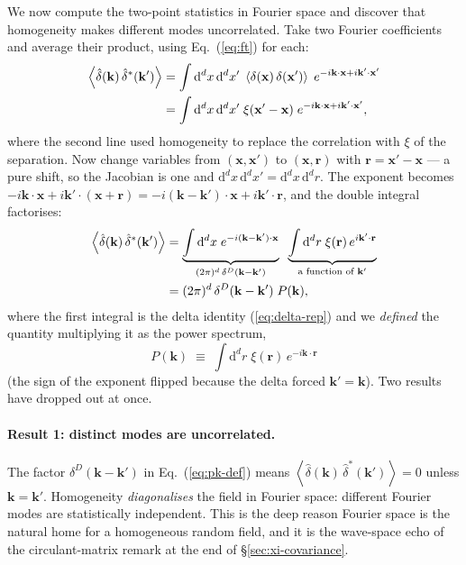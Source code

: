 \documentclass[12pt]{article}
\newcommand{\bk}{\mathbf{k}}
\newcommand{\bx}{\mathbf{x}}
\newcommand{\br}{\mathbf{r}}
\newcommand{\avg}[1]{\left\langle #1 \right\rangle}
\begin{document}
We now compute the two-point statistics in Fourier space and discover
that homogeneity makes different modes uncorrelated.  Take two Fourier
coefficients and average their product, using Eq.~(\ref{eq:ft}) for
each:
\begin{align}
  \avg{\hat\delta(\bk)\,\hat\delta^*(\bk')}
  &= \int \mathrm d^d x\,\mathrm d^d x'\;
     \avg{\delta(\bx)\,\delta(\bx')}\;
     e^{-i\bk\cdot\bx + i\bk'\cdot\bx'} \notag\\
  &= \int \mathrm d^d x\,\mathrm d^d x'\;
     \xi(\bx' - \bx)\;
     e^{-i\bk\cdot\bx + i\bk'\cdot\bx'},
  \label{eq:pk-step1}
\end{align}
where the second line used homogeneity to replace the correlation with
$\xi$ of the separation.  Now change variables from $(\bx, \bx')$ to
$(\bx, \br)$ with $\br = \bx' - \bx$ --- a pure shift, so the Jacobian is
one and $\mathrm d^d x\,\mathrm d^d x' = \mathrm d^d x\,\mathrm d^d r$.
The exponent becomes
$-i\bk\cdot\bx + i\bk'\cdot(\bx + \br) = -i(\bk - \bk')\cdot\bx +
i\bk'\cdot\br$, and the double integral factorises:
\begin{align}
  \avg{\hat\delta(\bk)\,\hat\delta^*(\bk')}
  &= \underbrace{\int \mathrm d^d x\; e^{-i(\bk-\bk')\cdot\bx}}_{(2\pi)^d\,\delta^D(\bk-\bk')}
     \;\;\underbrace{\int \mathrm d^d r\; \xi(\br)\,e^{i\bk'\cdot\br}}_{\text{a function of }\bk'} \notag\\
  &= (2\pi)^d\,\delta^D(\bk - \bk')\;P(\bk),
  \label{eq:pk-def}
\end{align}
where the first integral is the delta identity (\ref{eq:delta-rep}) and
we \emph{defined} the quantity multiplying it as the power spectrum,
\begin{equation}
  \boxed{\;P(\bk) \;\equiv\; \int \mathrm d^d r\; \xi(\br)\,e^{-i\bk\cdot\br}\;}
  \label{eq:wiener-khinchin}
\end{equation}
(the sign of the exponent flipped because the delta forced $\bk' = \bk$).
Two results have dropped out at once.

\paragraph{Result 1: distinct modes are uncorrelated.}
The factor $\delta^D(\bk - \bk')$ in Eq.~(\ref{eq:pk-def}) means
$\avg{\hat\delta(\bk)\,\hat\delta^*(\bk')} = 0$ unless $\bk = \bk'$.
Homogeneity \emph{diagonalises} the field in Fourier space: different
Fourier modes are statistically independent.  This is the deep reason
Fourier space is the natural home for a homogeneous random field, and
it is the wave-space echo of the circulant-matrix remark at the end of
\S\ref{sec:xi-covariance}.
\end{document}
